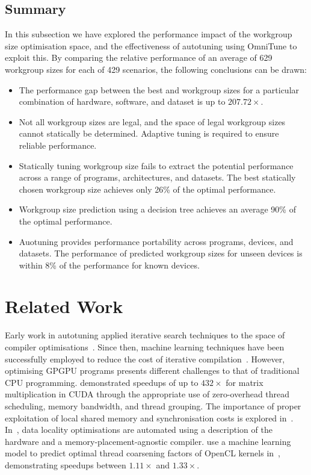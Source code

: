 \documentclass[nonatbib,preprint,9pt]{sigplanconf}
\begin{document}
\subsection{Summary}

In this subsection we have explored the performance impact of the
workgroup size optimisation space, and the effectiveness of autotuning
using OmniTune to exploit this. By comparing the relative performance
of an average of 629 workgroup sizes for each of 429 scenarios, the
following conclusions can be drawn:
%
\begin{itemize}
\item The performance gap between the best and workgroup sizes for a
  particular combination of hardware, software, and dataset is up to
  $207.72\times$.
\item Not all workgroup sizes are legal, and the space of legal
  workgroup sizes cannot statically be determined. Adaptive tuning is
  required to ensure reliable performance.
\item Statically tuning workgroup size fails to extract the potential
  performance across a range of programs, architectures, and
  datasets. The best statically chosen workgroup size achieves only
  26\% of the optimal performance.
\item Workgroup size prediction using a decision tree achieves an
  average 90\% of the optimal performance.
\item Auotuning provides performance portability across programs,
  devices, and datasets. The performance of predicted workgroup sizes
  for unseen devices is within 8\% of the performance for known
  devices.
\end{itemize}


\section{Related Work}\label{sec:related}

Early work in autotuning applied iterative search techniques to the
space of compiler optimisations~\cite{Bodin1998,Kisuki}. Since then,
machine learning techniques have been successfully employed to reduce
the cost of iterative
compilation~\cite{Agakov,Stephenson2003,Fursin2011}. However,
optimising GPGPU programs presents different challenges to that of
traditional CPU programming. \citeauthor{Ryoo2008a} demonstrated
speedups of up to $432\times$ for matrix multiplication in CUDA
through the appropriate use of zero-overhead thread scheduling, memory
bandwidth, and thread grouping. The importance of proper exploitation
of local shared memory and synchronisation costs is explored
in~\cite{Lee2010}. In~\cite{Chen2014}, data locality optimisations are
automated using a description of the hardware and a
memory-placement-agnostic compiler. \citeauthor{Magni2014} use a
machine learning model to predict optimal thread coarsening factors of
OpenCL kernels in~\cite{Magni2014}, demonstrating speedups between
$1.11\times$ and $1.33\times$.
\end{document}
